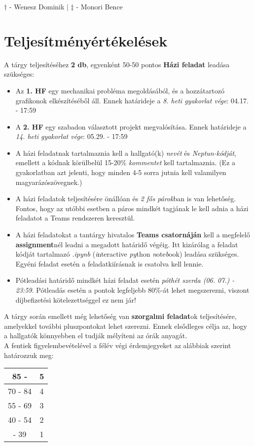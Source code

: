 \documentclass[12pt,a4paper]{article}
\begin{document}
\begin{scriptsize}
    \vspace{-2em}\hspace{1em}
    $\dagger$ - Wenesz Dominik $|$ $\ddagger$ - Monori Bence
\end{scriptsize}
\section{Teljesítményértékelések}
A tárgy teljesítéséhez \textbf{2 db}, egyenként 50-50 pontos \textbf{Házi feladat} leadása szükséges:
\begin{itemize}
    \item Az \textbf{1. HF} egy mechanikai probléma megoldásából, és a hozzátartozó grafikonok elkészítéséből áll. Ennek határideje a \textit{8. heti gyakorlat vége}: 04.17. - 17:59
    \item A \textbf{2. HF} egy szabadon választott projekt megvalósítása. Ennek határideje a \textit{14. heti gyakorlat vége}: 05.29. - 17:59
    \item A házi feladatnak tartalmaznia kell a hallgató(k) \textit{nevét} és \textit{Neptun-kódját}, emellett a kódnak körülbelül 15-20\% \textit{kommentet} kell tartalmaznia. (Ez a gyakorlatban azt jelenti, hogy minden 4-5 sorra jutnia kell valamilyen magyarázószövegnek.)
    \item A házi feladatok teljesítésére önállóan és \textit{2 fős párok}ban is van lehetőség. Fontos, hogy az utóbbi esetben a páros mindkét tagjának le kell adnia a házi feladatot a Teams rendszeren keresztül.
    \item A házi feladatokat a tantárgy hivatalos \textbf{Teams csatornáján} kell a megfelelő \textbf{assignment}nél leadni a megadott határidő végéig. Itt kizárólag a feladat kódját tartalmazó \textit{.ipynb} (\textit{i}nteractive \textit{py}thon \textit{n}ote\textit{b}ook) leadása szükséges. Egyéni feladat esetén a feladatkiírásnak is csatolva kell lennie.
    \item Pótleadási határidő mindkét házi feladat esetén \textit{póthét szerda (06. 07.) - 23:59}. Pótleadás esetén a pontok legfeljebb 80\%-át lehet megszerezni, viszont díjbefizetési kötelezettséggel ez nem jár!
\end{itemize}
A tárgy során emellett még lehetőség van \textbf{szorgalmi feladat}ok teljesítésére, amelyekkel további pluszpontokat lehet szerezni. Ennek elsődleges célja az, hogy a hallgatók könnyebben el tudják mélyíteni az órák anyagát.\\[10pt]
A fentiek figyelembevételével a félév végi érdemjegyeket az alábbiak szerint határozzuk meg:
\begin{table}[h]
    \centering
    \begin{tabular}{|c|c|}
        \hline
        85 - & 5 \\ \hline
        70 - 84 & 4 \\ \hline
        55 - 69 & 3 \\ \hline
        40 - 54 & 2 \\ \hline
        - 39 & 1 \\ \hline
    \end{tabular}
\end{table}
\end{document}
